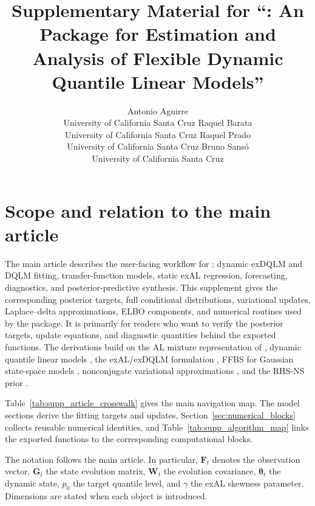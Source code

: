 \documentclass[nojss,noheadings]{jss}
\author{Antonio Aguirre \\ University of California Santa Cruz \And
        Raquel Barata \\ University of California Santa Cruz \AND
        Raquel Prado \\ University of California Santa Cruz \And
        Bruno Sans\'{o} \\ University of California Santa Cruz}
\title{Supplementary Material for ``\pkg{exdqlm}: An \proglang{R} Package for Estimation and Analysis of Flexible Dynamic Quantile Linear Models''}
\newcommand{\vect}[1]{\bm{#1}}
\newcommand{\mat}[1]{\mathbf{#1}}
\begin{document}
\section{Scope and relation to the main article}
\label{sec:supp_scope}

The main article describes the user-facing workflow for : dynamic
exDQLM and DQLM fitting, transfer-function models, static exAL regression,
forecasting, diagnostics, and posterior-predictive synthesis. This supplement
gives the corresponding posterior targets, full conditional distributions,
variational updates, Laplace--delta approximations, ELBO components, and
numerical routines used by the package. It is primarily for readers who want
to verify the posterior targets, update equations, and diagnostic quantities
behind the exported functions. The derivations build on the AL
mixture representation of \citet{kozumi2011gibbs}, dynamic quantile linear
models \citep{gonccalves2017dynamic}, the exAL/exDQLM formulation
\citep{yan2025family,me}, FFBS for Gaussian state-space models
\citep{carter1994gibbs,fruhwirth1994data}, nonconjugate variational
approximations \citep{wang2013nonconjugatevb}, and the RHS-NS prior
\citep{nishimura2023shrunken}.

Table~\ref{tab:supp_article_crosswalk} gives the main navigation map. The
model sections derive the fitting targets and updates,
Section~\ref{sec:numerical_blocks} collects reusable numerical identities, and
Table~\ref{tab:supp_algorithm_map} links the exported functions to the
corresponding computational blocks.

The notation follows the main article. In particular, $\mat{F}_t$ denotes the
observation vector, $\mat{G}_t$ the state evolution matrix, $\mat{W}_t$ the
evolution covariance, $\vect{\theta}_t$ the dynamic state, $p_0$ the target
quantile level, and $\gamma$ the exAL skewness parameter. Dimensions are stated
when each object is introduced.
\end{document}

